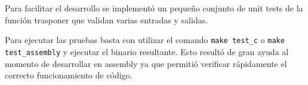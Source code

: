 \documentclass[11pt,a4paper]{article}
\begin{document}
Para facilitar el desarrollo se implementó un pequeño conjunto de unit tests de la función trasponer que validan varias entradas y salidas.

Para ejecutar las pruebas basta con utilizar el comando \texttt{make test\_c} o
\texttt{make test\_assembly} y ejecutar el binario resultante. Esto resultó de gran ayuda al momento de desarrollar en assembly ya que permitió verificar rápidamente el correcto funcionamiento de código.

\begin{figure}
\begin{center}
\end{center}
\end{figure}

\begin{figure}
\begin{center}
\end{center}
\end{figure}
\end{document}
